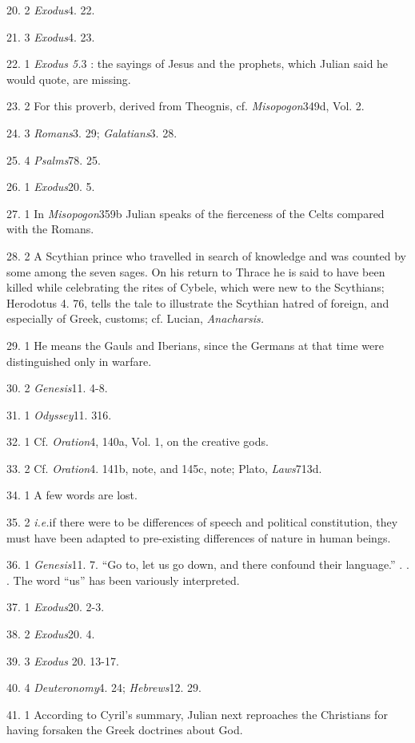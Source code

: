 20. 2 \emph{Exodus}4. 22.

21. 3 \emph{Exodus}4. 23.

22. 1 \emph{Exodus 5.}3 : the sayings of Jesus and the prophets,
which Julian said he would quote, are missing.

23. 2 For this proverb, derived from Theognis, cf. \emph{Misopogon}349d, Vol. 2.

24. 3 \emph{Romans}3. 29; \emph{Galatians}3. 28.

25. 4 \emph{Psalms}78. 25.

26. 1 \emph{Exodus}20. 5.

27. 1 In \emph{Misopogon}359b Julian speaks of the fierceness of the Celts compared with the Romans.

28. 2 A Scythian prince who travelled in search of knowledge and was counted by some among the seven sages. On his return to Thrace he is said to have been killed while celebrating the rites of Cybele, which were new to the Scythians; Herodotus 4. 76, tells the tale to illustrate the
Scythian hatred of foreign, and especially of Greek, customs; cf. Lucian, \emph{Anacharsis.}

29. 1 He means the Gauls and Iberians, since the Germans at that time were distinguished only in warfare.

30. 2 \emph{Genesis}11. 4-8.

31. 1 \emph{Odyssey}11. 316.

32. 1 Cf. \emph{Oration}4, 140a, Vol. 1, on the creative gods.

33. 2 Cf. \emph{Oration}4. 141b, note, and 145c, note; Plato, \emph{Laws}713d.

34. 1 A few words are lost.

35. 2 \emph{i.e.}if there were to be differences of speech and political constitution, they must have been adapted to pre-existing differences of nature in human beings.

36. 1 \emph{Genesis}11. 7. ``Go to, let us go down, and there confound their language.'' . . . The word ``us'' has been variously interpreted.

37. 1 \emph{Exodus}20. 2-3.

38. 2 \emph{Exodus}20. 4.

39. 3 \emph{Exodus} 20. 13-17.

40. 4 \emph{Deuteronomy}4. 24; \emph{Hebrews}12. 29.

41. 1 According to Cyril's summary, Julian next reproaches the Christians for having forsaken the Greek doctrines about God.

